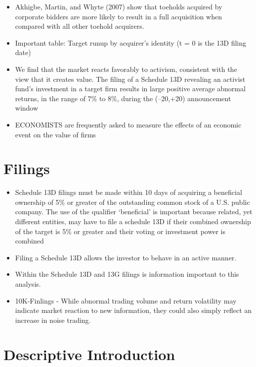\documentclass[12pt]{article}
\begin{document}
\begin{itemize}
        \item Akhigbe, Martin, and Whyte (2007) show that toeholds acquired by corporate bidders are more likely to result in a full acquisition when compared with all other toehold acquirers.\citep{Brigida2012}
        \item Important table: Target runup by acquirer's identity (t = 0 is the 13D filing date) \citep{Brigida2012}
        \item We find that the market reacts favorably to activism, consistent with the view that it creates value. The filing of a Schedule 13D revealing an activist fund’s investment in a target firm results in large positive average abnormal returns, in the range
        of 7\% to 8\%, during the (–20,+20) announcement window \citep{Brav2008}
        \item ECONOMISTS are frequently asked to measure the effects of an economic event on the value of firms \citep{MacKinlay1997}

    \end{itemize}

\section{Filings}

\begin{itemize}
    \item Schedule 13D filings must be made within 10 days of acquiring a beneficial ownership of 5\% or greater of the outstanding common stock of a U.S. public company. The use of the qualifier ‘beneficial’ is important because related, yet different entities, may have to file a schedule 13D if their combined ownership of the target is 5\% or greater and their voting or investment power is combined \citep{Brigida2012}
    \item Filing a Schedule 13D allows the investor to behave in an active manner. \citep{Brigida2012}
    \item Within the Schedule 13D and 13G filings is information important to this analysis. \citep{Brigida2012}
    \item 10K-Finlings - While abnormal trading volume and return volatility may indicate market reaction to new information, they could also simply reflect an increase in noise trading. \citep{You2009}
\end{itemize}


\section{Descriptive Introduction}
\end{document}

